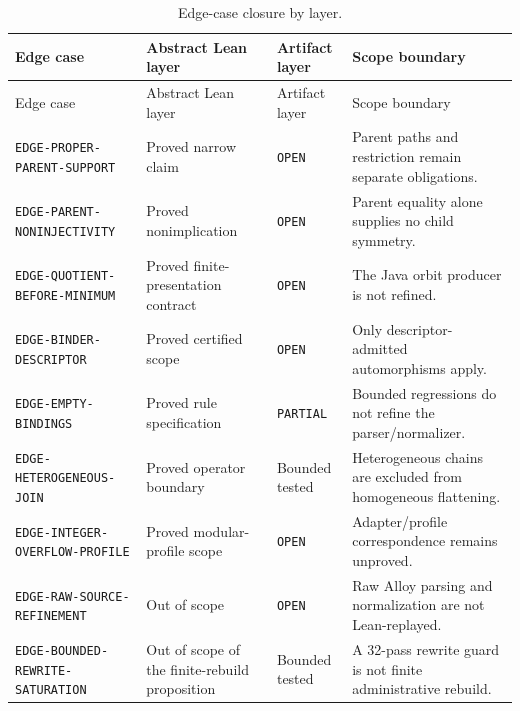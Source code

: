 \begin{longtable}{@{}p{3.05cm}p{2.55cm}p{2.15cm}p{3.2cm}@{}}
\caption{Edge-case closure by layer.}\label{tab:edge-case-closure}\\
\toprule
Edge case & Abstract Lean layer & Artifact layer & Scope boundary\\
\midrule\endfirsthead
\toprule
Edge case & Abstract Lean layer & Artifact layer & Scope boundary\\
\midrule\endhead
\texttt{EDGE-PROPER-PARENT-}\newline\texttt{SUPPORT} & Proved narrow claim & \texttt{OPEN} & Parent paths and restriction remain separate obligations.\\
\texttt{EDGE-PARENT-}\newline\texttt{NONINJECTIVITY} & Proved nonimplication & \texttt{OPEN} & Parent equality alone supplies no child symmetry.\\
\texttt{EDGE-QUOTIENT-BEFORE-}\newline\texttt{MINIMUM} & Proved finite-presentation contract & \texttt{OPEN} & The Java orbit producer is not refined.\\
\texttt{EDGE-BINDER-}\newline\texttt{DESCRIPTOR} & Proved certified scope & \texttt{OPEN} & Only descriptor-admitted automorphisms apply.\\
\texttt{EDGE-EMPTY-}\newline\texttt{BINDINGS} & Proved rule specification & \texttt{PARTIAL} & Bounded regressions do not refine the parser/normalizer.\\
\texttt{EDGE-HETEROGENEOUS-}\newline\texttt{JOIN} & Proved operator boundary & Bounded tested & Heterogeneous chains are excluded from homogeneous flattening.\\
\texttt{EDGE-INTEGER-OVERFLOW-}\newline\texttt{PROFILE} & Proved modular-profile scope & \texttt{OPEN} & Adapter/profile correspondence remains unproved.\\
\texttt{EDGE-RAW-SOURCE-}\newline\texttt{REFINEMENT} & Out of scope & \texttt{OPEN} & Raw Alloy parsing and normalization are not Lean-replayed.\\
\texttt{EDGE-BOUNDED-REWRITE-}\newline\texttt{SATURATION} & Out of scope of the finite-rebuild proposition & Bounded tested & A 32-pass rewrite guard is not finite administrative rebuild.\\
\bottomrule
\end{longtable}
\endgroup
